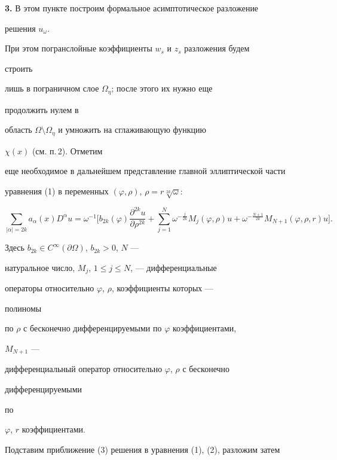  


{\bf 3.} В этом пункте построим формальное асимптотическое разложение 


решения $u_\omega$. 


При этом погранслойные коэффициенты $w_s$ и $z_s$ разложения будем 


строить  


лишь в пограничном слое $\Omega_\eta$; после этого их нужно еще 


продолжить нулем в  


область $\Omega\setminus\Omega_\eta$ и умножить на сглаживающую функцию 


$\chi(x)$ (см. п.\,2). Отметим  


еще необходимое в дальнейшем представление главной эллиптической части  


уравнения (1) в переменных $(\varphi,\rho)$, $\rho=r\sqrt[2k]{\omega}$: 


\begin{equation} 


\sum_{|\alpha|=2k}a_\alpha(x)D^\alpha u=\omega^{-1}\bigg[ 


b_{2k}(\varphi)\frac{\partial^{2k}u}{\partial\rho^{2k}}+ 


\sum^N_{j=1}\omega^{-\frac{j}{2k}}M_j(\varphi,\rho)u+ 


\omega^{-\frac{N+1}{2k}}M_{N+1}(\varphi,\rho,r)u\bigg]. 


\end{equation} 


Здесь $b_{2k}\in C^\infty(\partial\Omega)$, $b_{2k}>0$, $N$ --- 


натуральное число, $M_j$, $1\le j\le N$, --- дифференциальные  


операторы относительно $\varphi$, $\rho$, коэффициенты которых --- 


полиномы  


по $\rho$ с бесконечно дифференцируемыми по $\varphi$ коэффициентами, 


$M_{N+1}$ ---  


дифференциальный оператор относительно $\varphi$, $\rho$ с бесконечно 


дифференцируемыми  


по  


$\varphi$, $r$ коэффициентами. 


 


Подставим приближение (3) решения в уравнения (1), (2), разложим затем 



